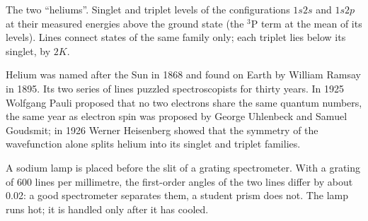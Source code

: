 \begin{omfigure}

{\small The two ``heliums''. Singlet and triplet levels of the configurations
$1s2s$ and $1s2p$ at their measured energies above the ground state (the
${}^3$P term at the mean of its levels). Lines connect states of the same
family only; each triplet lies below its singlet, by $2K$.}
\end{omfigure}

\begin{history}
Helium was named after the Sun in 1868 and found on Earth by William
Ramsay in 1895. Its two series of lines puzzled spectroscopists for thirty
years. In 1925 Wolfgang Pauli proposed that no two electrons share the
same quantum numbers, the same year as electron spin was proposed by George
Uhlenbeck and Samuel Goudsmit; in 1926 Werner Heisenberg showed that the
symmetry of the wavefunction alone splits helium into its singlet and
triplet families.
\end{history}

\begin{inthelab}
A sodium lamp is placed before the slit of a grating spectrometer. With a
grating of 600 lines per millimetre, the first-order angles of the two lines
differ by about \num{0.02}\textdegree: a good spectrometer separates them, a
student prism does not. The lamp runs hot; it is handled only after it has
cooled.
\end{inthelab}

